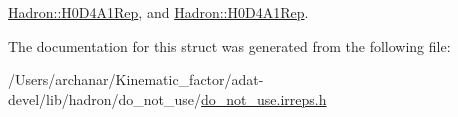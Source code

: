 \mbox{\hyperlink{structHadron_1_1H0D4A1Rep_afbedc9857e7215106a2225ff351ada68}{Hadron\+::\+H0\+D4\+A1\+Rep}}, and \mbox{\hyperlink{structHadron_1_1H0D4A1Rep_afbedc9857e7215106a2225ff351ada68}{Hadron\+::\+H0\+D4\+A1\+Rep}}.



The documentation for this struct was generated from the following file\+:\begin{DoxyCompactItemize}
\item 
/\+Users/archanar/\+Kinematic\+\_\+factor/adat-\/devel/lib/hadron/do\+\_\+not\+\_\+use/\mbox{\hyperlink{adat-devel_2lib_2hadron_2do__not__use_2do__not__use_8irreps_8h}{do\+\_\+not\+\_\+use.\+irreps.\+h}}\end{DoxyCompactItemize}
